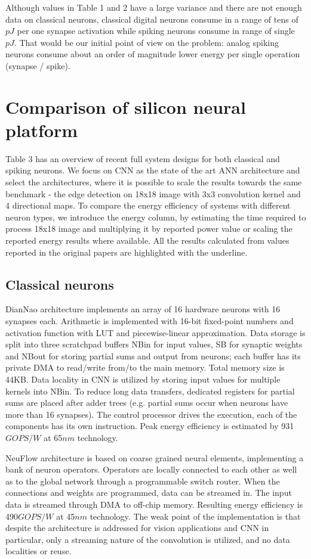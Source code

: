 \documentclass[conference, compsoc]{IEEEtran}
\begin{document}
Although values in Table 1 and 2 have a large variance and there are not enough data on classical neurons, classical digital neurons consume in a range of tens of $ pJ $ per one synapse activation while spiking neurons consume in range of single $ pJ $. That would be our initial point of view on the problem: analog spiking neurons consume about an order of magnitude lower energy per single operation (synapse / spike). 

\section{Comparison of silicon neural platform}
Table 3 has an overview of recent full system designs for both classical and spiking neurons. We focus on CNN as the state of the art ANN architecture and select the architectures, where it is possible to scale the results towards the same benchmark - the edge detection on 18x18 image with 3x3 convolution kernel and 4 directional maps. To compare the energy efficiency of systems with different neuron types, we introduce the energy column, by estimating the time required to process 18x18 image and multiplying it by reported power value or scaling the reported energy results where available. All the results calculated from values reported in the original papers are highlighted with the underline.
\subsection{Classical neurons}
DianNao architecture \cite{DianNao} implements an array of 16 hardware neurons with 16 synapses each. Arithmetic is implemented with 16-bit fixed-point numbers and activation function with LUT and piecewise-linear approximation. Data storage is split into three scratchpad buffers NBin for input values, SB for synaptic weights and NBout for storing partial sums and output from neurons; each buffer has its private DMA to read/write from/to the main memory. Total memory size is 44KB. Data  locality in CNN is utilized by storing input values for multiple kernels into NBin. To reduce long data transfers, dedicated registers for partial sums are placed after adder trees (e.g. partial sums occur when neurons have more than 16 synapses). The control processor drives the execution, each of the components has its own instruction. Peak energy efficiency is estimated by 931$ GOPS/W $ at 65$ nm $ technology.

NeuFlow architecture \cite{NeuFlow} is based on coarse grained neural elements, implementing a bank of neuron operators. Operators are locally connected to each other as well as to the global network through a programmable switch router. When the connections and weights are programmed, data can be streamed in. The input data is streamed through DMA to off-chip memory. Resulting energy efficiency is 490$ GOPS/W $ at 45$ nm $ technology. The weak point of the implementation is that despite the architecture is addressed for vision applications and CNN in particular, only a streaming nature of the convolution is utilized, and no data localities or reuse.
\end{document}
